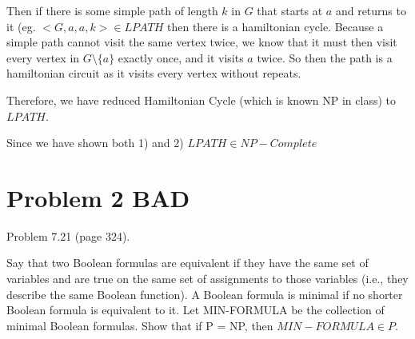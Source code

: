 \documentclass[11pt]{article}
\begin{document}
\begin{enumerate}[label=\alph*)]
\begin{enumerate}[label=\arabic*)]
Then if there is some simple path of length $k$ in $G$ that starts at $a$ and returns to it (eg. $<G, a, a, k> \in LPATH$ then there is a hamiltonian cycle. Because a simple path cannot visit the same vertex twice, we know that it must then visit every vertex in $G \setminus \{a\}$ exactly once, and it visits $a$ twice. So then the path is a hamiltonian circuit as it visits every vertex without repeats.

Therefore, we have reduced Hamiltonian Cycle (which is known NP in class) to $LPATH$.

\end{enumerate}

Since we have shown both 1) and 2) $LPATH \in NP-Complete$


\end{enumerate}

\newpage
\section*{Problem 2 BAD}

Problem 7.21 (page 324).

Say that two Boolean formulas are equivalent if they have the same set of variables
and are true on the same set of assignments to those variables (i.e., they describe
the same Boolean function). A Boolean formula is minimal if no shorter Boolean
formula is equivalent to it. Let MIN-FORMULA be the collection of minimal
Boolean formulas. Show that if P = NP, then $MIN-FORMULA \in P$.
\end{document}
